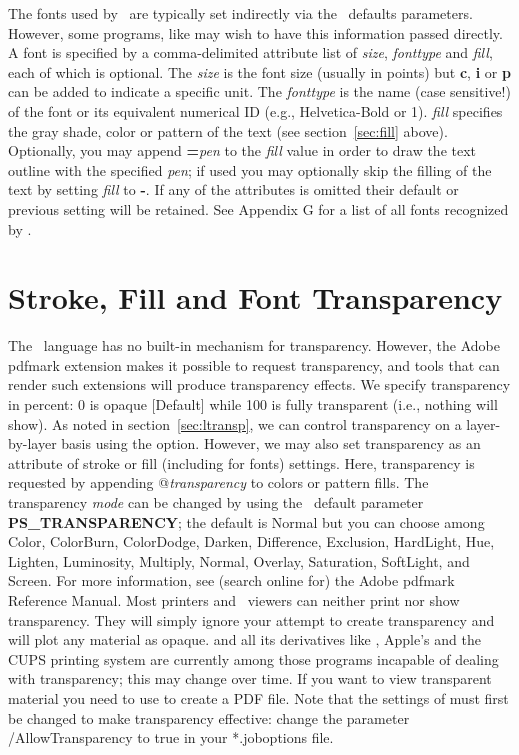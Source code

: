 The fonts used by \GMT\ are typically set indirectly via the \GMT\ defaults parameters.
However, some programs, like  may wish to have this information passed directly.
A font is specified by a comma-delimited attribute list of {\it size}, {\it fonttype} and {\it fill}, each of which is optional.
The {\it size} is the font size (usually in points) but {\bf c}, {\bf i} or {\bf p} can be added to indicate a specific unit.
The {\it fonttype} is the name (case sensitive!) of the font or its equivalent numerical ID (e.g., Helvetica-Bold or 1).
{\it fill} specifies the gray shade, color or pattern of the text (see section~\ref{sec:fill} above).
Optionally, you may append {\bf =}{\it pen} to the {\it fill} value in order to draw the text outline with the specified {\it pen};
if used you may optionally skip the filling of the text by setting {\it fill} to {\bf -}.
If any of the attributes is omitted their default or previous setting will be retained.
See Appendix G for a list of all fonts recognized by \GMT.

\section{Stroke, Fill and Font Transparency}

%
%
%
%
%
%
\label{sec:transp}

The \PS\ language has no built-in mechanism for transparency.  However, the Adobe pdfmark
extension makes it possible to request transparency, and tools that can render such extensions
will produce transparency effects.  We specify transparency in percent: 0 is opaque [Default]
while 100 is fully transparent (i.e., nothing will show).  As noted in section~\ref{sec:ltransp}, we can control
transparency on a layer-by-layer basis using the  option.  However, we may also set
transparency as an attribute of stroke or fill (including for fonts) settings.  Here, transparency is requested by
appending @\emph{transparency} to colors or pattern fills.  The transparency \emph{mode} can be changed
by using the \GMT\ default parameter {\bf PS\_TRANSPARENCY}; the default is Normal but you can choose among
Color, ColorBurn, ColorDodge, Darken, Difference, Exclusion, HardLight, Hue,
Lighten, Luminosity, Multiply, Normal, Overlay, Saturation, SoftLight, and Screen.
For more information, see (search online for) the Adobe pdfmark Reference Manual.
Most printers and \PS\ viewers can neither print nor show transparency. They will simply ignore your attempt to
create transparency and will plot any material as opaque.  and all its derivatives
like , Apple's  and the CUPS printing system are currently among
those programs incapable of dealing with transparency; this may change over time.
If you want to view transparent material you need to use  to create a
PDF file. Note that the settings of  must first be changed to make
transparency effective: change the parameter /AllowTransparency to true in your *.joboptions file.

